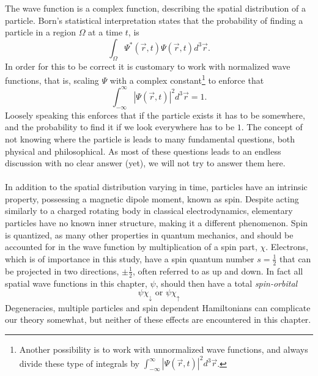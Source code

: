 The wave function is a complex function, describing the spatial distribution of a particle.
Born's statistical interpretation states that the probability of finding a
particle in a region $\Omega$ at a time $t$, is
\begin{equation}
\int_{\Omega} \Psi^{*}(\vec{r},t) \Psi(\vec{r},t) d^3\vec{r} .
\end{equation}
In order for this to be correct it is customary to work with normalized wave
functions, that is, scaling $\Psi$ with a complex 
constant\footnote{Another possibility is to work
with unnormalized wave functions, and always divide these type of integrals by
$\int_{-\infty}^{\infty} \left| \Psi(\vec{r},t) \right|^2 d^3\vec{r}$.}
to enforce that
\begin{equation}
\int_{-\infty}^{\infty} \left| \Psi(\vec{r},t) \right|^2 d^3\vec{r} = 1 .
\end{equation}
Loosely speaking this enforces that if the particle exists it has to be somewhere, and the probability to find it if we look everywhere has to be $1$.
The concept of not knowing where the particle is leads to many fundamental
questions, both physical and philosophical.
As most of these questions leads to an endless discussion with no clear answer
(yet), we will not try to answer them here. 

\paragraph*{}
In addition to the spatial distribution varying in time, particles have an intrinsic property, possessing a magnetic dipole moment, known as spin.
Despite acting similarly to a charged rotating body in classical electrodynamics, elementary particles have no known inner structure, making it a different phenomenon.
Spin is quantized, as many other properties in quantum mechanics, and should be accounted for in the wave function by multiplication of a spin part, $\chi$.
Electrons, which is of importance in this study, have a spin quantum number $s = \frac{1}{2}$ that can be projected in two directions, $\pm\frac{1}{2}$, often referred to as up and down.
In fact all spatial wave functions in this chapter, $\psi$, should then have a total \textit{spin-orbital} 
\begin{equation}
\psi \chi_{\downarrow} \textrm{ or } \psi \chi_{\uparrow}
\end{equation}
Degeneracies, multiple particles and spin dependent Hamiltonians can complicate our theory somewhat, but neither of these effects are encountered in this chapter.



